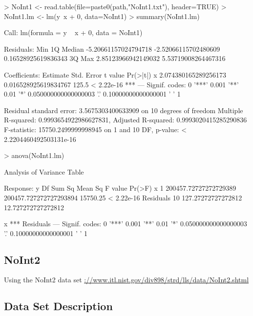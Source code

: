 \documentclass[10pt]{article}
\begin{document}
\begin{Schunk}
\begin{Sinput}
> NoInt1 <- read.table(file=paste0(path,"NoInt1.txt"), header=TRUE)
> NoInt1.lm <- lm(y~x + 0, data=NoInt1)
> summary(NoInt1.lm)
\end{Sinput}
\begin{Soutput}
Call:
lm(formula = y ~ x + 0, data = NoInt1)

Residuals:
                 Min                   1Q               Median 
-5.20661157024794718 -2.52066115702480609  0.16528925619836343 
                  3Q                  Max 
 2.85123966942149032  5.53719008264467316 

Coefficients:
              Estimate           Std. Error t value   Pr(>|t|)    
x 2.074380165289256173 0.016528925619834767   125.5 < 2.22e-16 ***
---
Signif. codes:  
0 '***' 0.001 '**' 0.01 '*' 0.050000000000000003 '.' 0.10000000000000001 ' ' 1

Residual standard error: 3.5675303400633909 on 10 degrees of freedom
Multiple R-squared:  0.9993654922986627831,	Adjusted R-squared:  0.9993020415285290836 
F-statistic:  15750.2499999998945 on 1 and 10 DF,  p-value: < 2.2204460492503131e-16
\end{Soutput}
\begin{Sinput}
> anova(NoInt1.lm)
\end{Sinput}
\begin{Soutput}
Analysis of Variance Table

Response: y
          Df                Sum Sq                Mean Sq  F value     Pr(>F)
x          1 200457.72727272729389 200457.727272727293894 15750.25 < 2.22e-16
Residuals 10    127.27272727272812     12.727272727272812                    
             
x         ***
Residuals    
---
Signif. codes:  
0 '***' 0.001 '**' 0.01 '*' 0.050000000000000003 '.' 0.10000000000000001 ' ' 1
\end{Soutput}
\end{Schunk}

\subsection{NoInt2}
Using the NoInt2 data set \url{://www.itl.nist.gov/div898/strd/lls/data/NoInt2.shtml}

\subsection*{Data Set Description}
\end{document}
